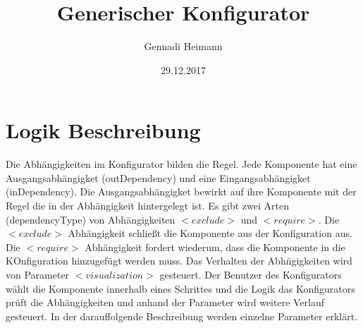 \documentclass{article}
\begin{document}
\begin{titlepage}

\author{Gennadi Heimann} 
\title{Generischer Konfigurator} 
\date{29.12.2017} 
\maketitle
\end{titlepage}

\section{Logik Beschreibung}

Die Abh\"angigkeiten im Konfigurator bilden die Regel. Jede Komponente hat eine
Ausgangsabh\"angigket (outDependency) und eine Eingangsabh\"angigket
(inDependency). Die Ausgangsabh\"angigket bewirkt auf ihre Komponente mit der
Regel die in der Abh\"angigkeit hintergelegt ist. 
Es gibt zwei Arten (dependencyType) von Abh\"angigkeiten $<exclude>$ und
$<require>$. Die $<exclude>$ Abh\"angigkeit schlie\ss{}t die Komponente aus der
Konfiguration aus. Die $<require>$ Abh\"angigkeit fordert wiederum, dass die
Komponente in die KOnfiguration hinzugef\"ugt werden muss. Das Verhalten der
Abh\"ngigkeiten wird von Parameter $<visualization>$ gesteuert. Der Benutzer
des Konfigurators w\"ahlt die Komponente innerhalb eines Schrittes und die
Logik das Konfigurators pr\"uft die Abh\"angigkeiten und anhand der Parameter
wird weitere Verlauf gesteuert. In der darauffolgende Beschreibung werden
einzelne Parameter erkl\"art.
\end{document}
